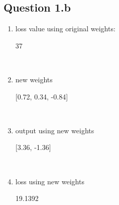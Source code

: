 \documentclass[12pt]{article}
\begin{document}
\subsection*{Question 1.b}
\begin{enumerate}
        \item{loss value using original weights: }
            \begin{tcolorbox}[fit,height=1cm, width=2cm, blank, borderline={1pt}{1pt},nobeforeafter]
            \begin{center}
            \vspace{3mm}
            37
            \end{center}
            \end{tcolorbox} \vspace{0.8cm} \\
        \item{new weights} 
            \begin{tcolorbox}[fit,height=1cm, width=9cm, blank, borderline={1pt}{1pt},nobeforeafter]
            \begin{center}
            \vspace{3mm}
            [0.72, 0.34, -0.84]
            \end{center}
            \end{tcolorbox}
            \vspace{0.8cm} \\
        \item{output using new weights}
            \begin{tcolorbox}[fit,height=1cm, width=6cm, blank, borderline={1pt}{1pt},nobeforeafter]
            \begin{center}
            \vspace{3mm}
            [3.36, -1.36]
            \end{center}
            \end{tcolorbox}
            \vspace{0.8cm} \\
        \item{loss using new weights}
            \begin{tcolorbox}[fit,height=1cm, width=2cm, blank, borderline={1pt}{1pt},nobeforeafter]
            \begin{center}
            \vspace{3mm}
            19.1392
            \end{center}
            \end{tcolorbox}
\end{enumerate}
\end{document}
